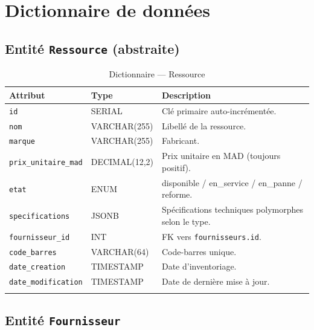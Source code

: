 \documentclass[a4paper,11pt,openany]{report}
\newcommand{\mad}{MAD}
\begin{document}
\section{Dictionnaire de données}

\subsection{Entité \texttt{Ressource} (abstraite)}

\begin{longtable}{p{4cm} p{3.5cm} p{6cm}}
\toprule
\textbf{Attribut} & \textbf{Type} & \textbf{Description} \\
\midrule
\endhead
\texttt{id} & SERIAL & Clé primaire auto-incrémentée. \\
\texttt{nom} & VARCHAR(255) & Libellé de la ressource. \\
\texttt{marque} & VARCHAR(255) & Fabricant. \\
\texttt{prix\_unitaire\_mad} & DECIMAL(12,2) & Prix unitaire en
\mad{} (toujours positif). \\
\texttt{etat} & ENUM & disponible / en\_service / en\_panne /
reforme. \\
\texttt{specifications} & JSONB & Spécifications techniques
polymorphes selon le type. \\
\texttt{fournisseur\_id} & INT & FK vers \texttt{fournisseurs.id}. \\
\texttt{code\_barres} & VARCHAR(64) & Code-barres unique. \\
\texttt{date\_creation} & TIMESTAMP & Date d'inventoriage. \\
\texttt{date\_modification} & TIMESTAMP & Date de dernière mise à jour. \\
\bottomrule
\caption{Dictionnaire --- Ressource}
\label{tab:dictRessource}
\end{longtable}

\subsection{Entité \texttt{Fournisseur}}
\end{document}
